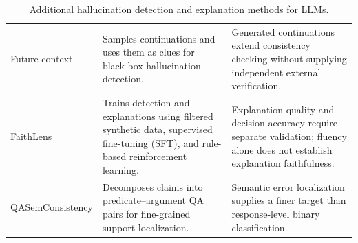 \begin{table}[tp]
\begin{tabularx}{\textwidth}{@{}p{}p{}X@{}}
Future context \citep{lee-etal-2026-enhancing} & Samples continuations and uses them as clues for black-box hallucination detection. & Generated continuations extend consistency checking without supplying independent external verification. \\
FaithLens \citep{si-etal-2026-faithlens} & Trains detection and explanations using filtered synthetic data, supervised fine-tuning (SFT), and rule-based reinforcement learning. & Explanation quality and decision accuracy require separate validation; fluency alone does not establish explanation faithfulness. \\
QASemConsistency \citep{cattan-etal-2026-localizing} & Decomposes claims into predicate--argument QA pairs for fine-grained support localization. & Semantic error localization supplies a finer target than response-level binary classification. \\
\bottomrule\end{tabularx}
\caption{Additional hallucination detection and explanation methods for LLMs.}
\label{tab:extra-detection}
\end{table}

